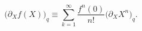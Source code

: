 \begin{equation*}
\bigl(\partial_X f(X)\bigr)_q\equiv \sum_{k=1}^\infty \frac{f^{n}(0)}{n!}
\bigl(\partial_X X^n\bigr)_q. \nonumber
\end{equation*}

